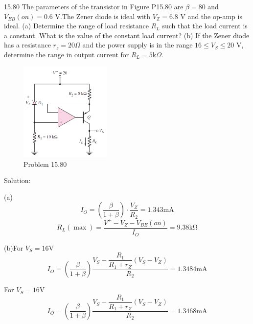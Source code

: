 \documentclass[a4paper,11pt,UTF8]{article}
\begin{document}
15.80 The parameters of the transistor in Figure P15.80 are $\beta=80$ and $V_{EB}( on) = 0.6$ V.The Zener diode is ideal with $V_{\mathbb{Z}}=6.8$ V and the op-amp is ideal. (a) Determine the range of load resistance $R_L$ such that the load current is a constant. What is the value of the constant load current? (b) If the Zener diode has a resistance $r_z=20\Omega$ and the power supply is in the range $16\leq V_S\leq20$ V, determine the range in output current for 
$R_L= 5$k$\Omega.$
\begin{figure}[H]
	\centering
	\includegraphics[width=0.4\textwidth]{15.80}
	\caption{Problem 15.80}
\end{figure}
\noindent Solution:

(a)
	$$I_{O}=\left(\frac{\beta}{1+\beta}\right)\cdot \frac{V_Z}{R_2}=1.343\mathrm{mA}$$
	$$R_L(\max)=\frac{V^+-V_Z-V_{BE}(on)}{I_O}=9.38\mathrm{k\Omega}$$
	
(b)For $V_S=16$V
$$
	I_O=\left(\frac{\beta}{1+\beta}\right)\dfrac{V_S-\dfrac{R_1}{R_1+r_Z}(V_S-V_Z)}{R_2}=1.3484\mathrm{mA}
$$

For $V_S=16$V
$$
I_O=\left(\frac{\beta}{1+\beta}\right)\dfrac{V_S-\dfrac{R_1}{R_1+r_Z}(V_S-V_Z)}{R_2}=1.3468\mathrm{mA}
$$
\end{document}
